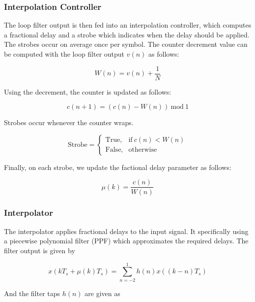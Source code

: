 \documentclass{article}
\begin{document}
\subsubsection{Interpolation Controller}

The loop filter output is then fed into an interpolation controller, which computes a fractional delay and a strobe which indicates when the delay should be applied. The strobes occur on average once per symbol. The counter decrement value can be computed with the loop filter output $v(n)$ as follows:

\begin{equation}
	W(n) = v(n) + \frac{1}{N}
\end{equation}

\noindent Using the decrement, the counter is updated as follows:

\begin{equation}
	c(n + 1) = (c(n) - W(n))\ \text{mod}\ 1
\end{equation}

\noindent Strobes occur whenever the counter wraps.

\begin{equation}
	\text{Strobe} = \begin{cases}
		\text{True}, & \text{if}\ c(n) < W(n)\\
		\text{False}, & \text{otherwise}
	\end{cases}
\end{equation}

\noindent Finally, on each strobe, we update the factional delay parameter as follows:

\begin{equation}
	\mu(k) = \frac{c(n)}{W(n)}
\end{equation}

\subsubsection{Interpolator}

The interpolator applies fractional delays to the input signal. It specifically using a piecewise polynomial filter (PPF) which approximates the required delays. The filter output is given by

\begin{equation}
	x(kT_s + \mu(k)T_s) = \sum_{n=-2}^{1}{h(n)x((k-n)T_s)}
\end{equation}

\noindent And the filter taps $h(n)$ are given as
\end{document}
